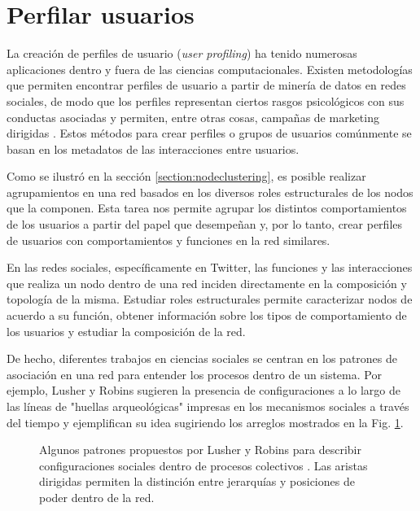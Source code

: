 \section{Perfilar usuarios}
\label{sec:proposal:users}

 La creación de perfiles de usuario (\textit{user profiling}) ha tenido numerosas aplicaciones dentro y fuera de las ciencias computacionales. Existen metodologías que permiten encontrar perfiles de usuario a partir de minería de datos en redes sociales, de modo que los perfiles representan ciertos rasgos psicológicos con sus conductas asociadas y permiten, entre otras cosas, campañas de marketing dirigidas \cite{hu_cambridge_2020}. Estos métodos para crear perfiles o grupos de usuarios comúnmente se basan en los metadatos de las interacciones entre usuarios.
 
Como se ilustró en la sección \ref{section:nodeclustering}, es posible realizar agrupamientos en una red basados en los diversos roles estructurales de los nodos que la componen. Esta tarea nos permite agrupar los distintos comportamientos de los usuarios a partir del papel que desempeñan y, por lo tanto, crear perfiles de usuarios con comportamientos y funciones en la red similares.
 
En las redes sociales, específicamente en Twitter, las funciones y las interacciones que realiza un nodo dentro de una red inciden directamente en la composición y topología de la misma. Estudiar roles estructurales permite caracterizar nodos de acuerdo a su función, obtener información sobre los tipos de comportamiento de los usuarios y estudiar la composición de la red.

De hecho, diferentes trabajos en ciencias sociales se centran en los patrones de asociación en una red para entender los procesos dentro de un sistema. Por ejemplo, Lusher y Robins sugieren la presencia de configuraciones a lo largo de las líneas de "huellas arqueológicas" impresas en los mecanismos sociales a través del tiempo y ejemplifican su idea sugiriendo los arreglos mostrados en la Fig. \ref{fig:lusher}.

\begin{figure}[htbp]
  \centering
  
    \caption{Algunos patrones propuestos por Lusher y Robins para describir configuraciones sociales dentro de procesos colectivos \citep{lusher_exponential_nodate}. Las aristas dirigidas permiten la distinción entre jerarquías y posiciones de poder dentro de la red.}
    \label{fig:lusher}
\end{figure}

